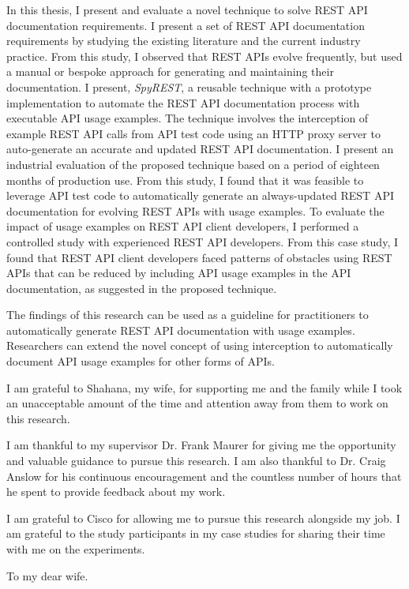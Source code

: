 \documentclass[12pt]{ucalgthes1}
\begin{document}
In this thesis, I present and evaluate a novel technique to solve REST API documentation requirements. I present a set of REST API documentation requirements by studying the existing literature and the current industry practice. From this study, I observed that REST APIs evolve frequently, but used a manual or bespoke approach for generating and maintaining their documentation. I present, \textit{SpyREST}, a reusable technique with a prototype implementation to automate the REST API documentation process with executable API usage examples. The technique involves the interception of example REST API calls from API test code using an HTTP proxy server to auto-generate an accurate and updated REST API documentation. I present an industrial evaluation of the proposed technique based on a period of eighteen months of production use. From this study, I found that it was feasible to leverage API test code to automatically generate an always-updated REST API documentation for evolving REST APIs with usage examples. To evaluate the impact of usage examples on REST API client developers, I performed a controlled study with experienced REST API developers. From this case study, I found that REST API client developers faced patterns of obstacles using REST APIs that can be reduced by including API usage examples in the API documentation, as suggested in the proposed technique.

The findings of this research can be used as a guideline for practitioners to automatically generate REST API documentation with usage examples. Researchers can extend the novel concept of using interception to automatically document API usage examples for other forms of APIs.

\newpage
{}
{}
\begin{singlespace}
I am grateful to Shahana, my wife, for supporting me and the family while I took an unacceptable amount of the time and attention away from them to work on this research.

I am thankful to my supervisor Dr. Frank Maurer for giving me the opportunity and valuable guidance to pursue this research. I am also thankful to Dr. Craig Anslow for his continuous encouragement and the countless number of hours that he spent to provide feedback about my work.

I am grateful to Cisco for allowing me to pursue this research alongside my job. I am grateful to the study participants in my case studies for sharing their time with me on the experiments.
\newpage
{}
{}
\begin{center}
  To my dear wife.
\end{center}
\newpage
{}
\tableofcontents
\pagestyle{plain}
\newpage
{}
\listoftables
\pagestyle{plain}
\newpage
{}
\listoffigures
\pagestyle{plain}
\clearpage
\clearpage          %
\end{singlespace}
\newpage
{}
\end{document}
